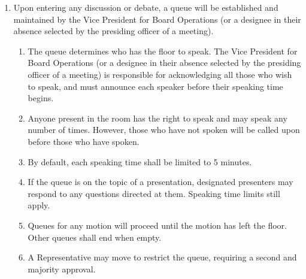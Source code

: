 \documentclass{uniondoc}
\begin{document}
\begin{enumerate}
\begin{enumerate}
    \begin{enumerate}
    \item If a Representative suggests changes to the motion pertaining to its wording or language, but do not change its intent or merits, it may be amended by the author with the consent of the second.
    \item If a Representative suggests changes to the motion pertaining to its intent or merits, it may be amended by a majority vote of the Executive Board. This vote shall be conducted by a voice vote unless a show of hands or a roll call is requested by a Representative or the President.
    \item After any amendments are made, the President (or presiding officer of a meeting) shall read the amended motion aloud.
    \end{enumerate}
  \item Once all motions pertaining to the topic have concluded, parties with a conflict of interest shall be invited back into the room and the President (or presiding officer of a meeting) shall announce the outcome of all motions discussed.
  \end{enumerate}
\item Upon entering any discussion or debate, a queue will be established and maintained by the Vice President for Board Operations (or a designee in their absence selected by the presiding officer of a meeting).
  \begin{enumerate}
  \item The queue determines who has the floor to speak. The Vice President for Board Operations (or a designee in their absence selected by the presiding officer of a meeting) is responsible for acknowledging all those who wish to speak, and must announce each speaker before their speaking time begins.
  \item Anyone present in the room has the right to speak and may speak any number of times. However, those who have not spoken will be called upon before those who have spoken.
  \item By default, each speaking time shall be limited to 5 minutes.
  \item If the queue is on the topic of a presentation, designated presenters may respond to any questions directed at them. Speaking time limits still apply.
  \item Queues for any motion will proceed until the motion has left the floor. Other queues shall end when empty.
  \item A Representative may move to restrict the queue, requiring a second and majority approval.

\end{enumerate}
\end{enumerate}
\end{document}
